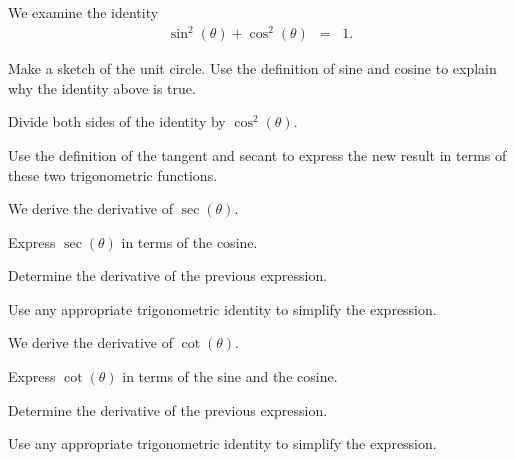 \begin{problem}

\item We examine the identity 
  \begin{eqnarray*}
    \sin^2(\theta) + \cos^2(\theta) & = & 1.
  \end{eqnarray*}
  
  \begin{subproblem}
  \item Make a sketch of the unit circle. Use the definition of sine
    and cosine to explain why the identity above is true.
    \vfill

  \item Divide both sides of the identity by $\cos^2(\theta)$. 
    \vfill

  \item Use the definition of the tangent and secant to express the
    new result in terms of these two trigonometric functions.
    \vfill

  \end{subproblem}

  \clearpage

\item We derive the derivative of $\sec(\theta)$.

  \begin{subproblem}
    \item Express $\sec(\theta)$ in terms of the cosine.
      \vspace{4em}
    \item Determine the derivative of the previous expression.
      \vfill
    \item Use any appropriate trigonometric identity to simplify the
      expression.
      \vfill
  \end{subproblem}
  \clearpage

\item We derive the derivative of $\cot(\theta)$.

  \begin{subproblem}
    \item Express $\cot(\theta)$ in terms of the sine and the cosine.
      \vspace{4em}
    \item Determine the derivative of the previous expression.
      \vfill
    \item Use any appropriate trigonometric identity to simplify the
      expression.
      \vfill
  \end{subproblem}
  \clearpage

\end{problem}

